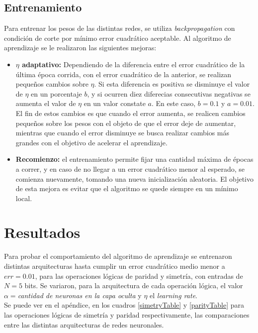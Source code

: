 \documentclass{article}
\begin{document}
\subsection{Entrenamiento}
Para entrenar los pesos de las distintas redes, se utiliza \textit{backpropagation} con condición de corte por mínimo error cuadrático aceptable. Al algoritmo de aprendizaje se le realizaron las siguientes mejoras:
\begin{itemize}
 \item \textbf{$\eta$ adaptativo:} Dependiendo de la diferencia entre el error cuadrático de la última época corrida, con el error
cuadrático de la anterior, se realizan pequeños cambios sobre $\eta$. Si esta diferencia es positiva se disminuye el valor de $\eta$ en un porcentaje $b$, y si ocurren
diez diferecias consecutivas negativas se aumenta el valor de $\eta$ en un valor constate $a$. En este caso, $b=0.1$ y $a=0.01$. El fin de estos cambios es que cuando el error aumenta, se realicen cambios pequeños sobre los pesos con el objeto de que el error deje de aumentar, mientras que cuando el error disminuye se busca realizar cambios más grandes con el objetivo de acelerar el aprendizaje.
 \item \textbf{Recomienzo:} el entrenamiento permite fijar una cantidad máxima de épocas a correr, y en caso de no llegar a un error cuadrático menor al esperado, se comienza nuevamente, tomando una nueva inicialización aleatoria. El objetivo de esta  mejora es evitar que el algoritmo se quede siempre en un mínimo local.
\end{itemize}

\section{Resultados}
Para probar el comportamiento del algoritmo de aprendizaje se entrenaron distintas arquitecturas hasta cumplir 
un error cuadrático medio menor a $err=0.01$, para las operaciones lógicas de paridad y simetría, con entradas 
de $N=5$ bits. Se variaron, para la arquitectura de cada operación lógica, el valor $\alpha=$\textit{cantidad de 
neuronas en la capa oculta} y $\eta$ el \textit{learning rate}. \\


Se puede ver en el apéndice, en los cuadros \ref{simetryTable} y \ref{parityTable} para las operaciones lógicas 
de simetría y paridad respectivamente, las comparaciones entre las distintas arquitecturas de redes neuronales.\\
\end{document}

